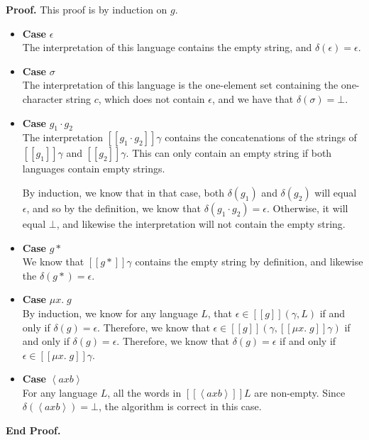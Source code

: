 \documentclass{article}
\newcommand{\fix}[2]{\mu {#1}.\;{#2}}
\newcommand{\lft}[1]{\left<{#1}\right.}
\newcommand{\rgt}[1]{\left.{#1}\right>}
\newcommand{\interp}[1]{[\![{#1}]\!]}
\newcommand{\emptify}[1]{\delta({#1})}
\newenvironment{proof}{\noindent\textbf{Proof.}}
{\noindent\textbf{End Proof.}}
\newenvironment{caseblock}{\begin{itemize}}{\end{itemize}}
\newenvironment{case}[1]{\item \textbf{Case} {#1}\\}{}
\begin{document}
\begin{proof}
This proof is by induction on $g$. 
\begin{caseblock}
  \begin{case}{$\epsilon$}
    The interpretation of this language contains the empty string, and $\emptify{\epsilon} = \epsilon$. 
  \end{case}

  \begin{case}{$\sigma$}
    The interpretation of this language is the one-element set containing the one-character string $c$, 
    which does not contain $\epsilon$, and we have that $\emptify{\sigma} = \bot$. 
  \end{case}

  \begin{case}{$g_1\cdot g_2$}
    The interpretation $\interp{g_1\cdot g_2}\gamma$ contains the concatenations of the strings of
    $\interp{g_1}\gamma$ and $\interp{g_2}\gamma$. This can only contain an empty string if both 
    languages contain empty strings. 

    By induction, we know that in that case, both $\emptify{g_1}$ and $\emptify{g_2}$ will equal $\epsilon$, 
    and so by the definition, we know that $\emptify{g_1\cdot g_2} = \epsilon$. Otherwise, it will equal
    $\bot$, and likewise the interpretation will not contain the empty string.
  \end{case}

  \begin{case}{$g*$}
    We know that $\interp{g*}\gamma$ contains the empty string by definition, and likewise the 
    $\emptify{g*} = \epsilon$. 
  \end{case}

  \begin{case}{$\fix{x}{g}$}
    By induction, we know for any language $L$, that $\epsilon \in \interp{g}(\gamma, L)$  if and 
    only if $\emptify{g} = \epsilon$. Therefore, we know that 
    $\epsilon \in \interp{g}(\gamma, \interp{\fix{x}{g}}\gamma)$ if and only if $\emptify{g} = \epsilon$. 
    Therefore, we know that $\emptify{g} = \epsilon$ if and only if $\epsilon \in \interp{\fix{x}{g}}\gamma$. 
  \end{case}

  \begin{case}{$\lft{a}x\rgt{b}$}
    For any language $L$, all the words in $\interp{\lft{a}x\rgt{b}}L$ are non-empty. 
    Since $\emptify{\lft{a}x\rgt{b}} = \bot$, the algorithm is correct in this case. 
  \end{case}


\end{caseblock}
\end{proof}
\end{document}
